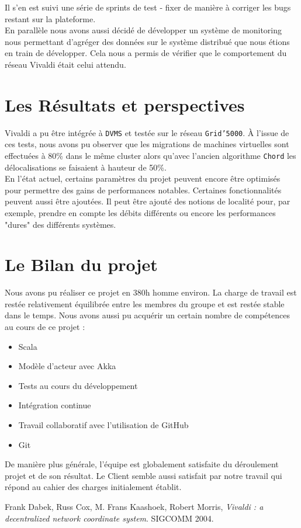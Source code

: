 \documentclass[11pt,a4paper]{article}
\begin{document}
Il s'en est suivi une série de sprints de test - fixer de manière à corriger les bugs restant sur la plateforme.\\

En parallèle nous avons aussi décidé de développer un système de monitoring nous permettant d'agréger des données sur le système distribué que nous étions en train de développer. Cela nous a permis de vérifier que le comportement du réseau Vivaldi était celui attendu.

\section{Les Résultats et perspectives}
Vivaldi a pu être intégrée à \texttt{DVMS} et testée sur le réseau \texttt{Grid'5000}. À l'issue de ces tests, nous avons pu observer que les migrations de machines virtuelles sont effectuées à 80\% dans le même cluster alors qu'avec l'ancien algorithme \texttt{Chord} les délocalisations se faisaient à hauteur de 50\%.\\

En l'état actuel, certains paramètres du projet peuvent encore être optimisés pour permettre des gains de performances notables. Certaines fonctionnalités peuvent aussi être ajoutées. Il peut être ajouté des notions de localité pour, par exemple, prendre en compte les débits différents ou encore les performances "dures" des différents systèmes.

\section{Le Bilan du projet}
Nous avons pu réaliser ce projet en 380h homme environ. La charge de travail est restée relativement équilibrée entre les membres du groupe et est restée stable dans le temps. Nous avons aussi pu acquérir un certain nombre de compétences au cours de ce projet :
\begin{itemize}
\item Scala
\item Modèle d'acteur avec Akka
\item Tests au cours du développement
\item Intégration continue
\item Travail collaboratif avec l'utilisation de GitHub
\item Git \\
\end{itemize}

De manière plus générale, l'équipe est globalement satisfaite du déroulement projet et de son résultat. Le Client semble aussi satisfait par notre travail qui répond au cahier des charges initialement établit. 

\begin{thebibliography}{9}

  Frank Dabek, Russ Cox, M. Frans Kaashoek, Robert Morris,
  \emph{Vivaldi : a decentralized network coordinate system}.
  SIGCOMM 2004.

\end{thebibliography}
\end{document}

